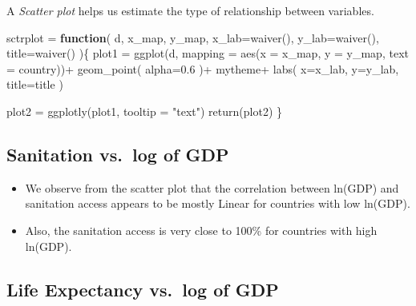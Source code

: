 \documentclass[
]{article}
\newenvironment{Shaded}{}{}
\newcommand{\AttributeTok}[1]{\textcolor[rgb]{0.84,0.60,0.13}{#1}}
\newcommand{\ControlFlowTok}[1]{\textcolor[rgb]{0.80,0.14,0.11}{\textbf{#1}}}
\newcommand{\FloatTok}[1]{\textcolor[rgb]{0.96,0.45,0.00}{#1}}
\newcommand{\FunctionTok}[1]{\textcolor[rgb]{0.41,0.62,0.42}{#1}}
\newcommand{\NormalTok}[1]{\textcolor[rgb]{0.24,0.22,0.21}{#1}}
\newcommand{\OtherTok}[1]{\textcolor[rgb]{0.41,0.62,0.42}{#1}}
\newcommand{\SpecialCharTok}[1]{\textcolor[rgb]{0.69,0.38,0.53}{#1}}
\newcommand{\StringTok}[1]{\textcolor[rgb]{0.60,0.59,0.10}{#1}}
\providecommand{\tightlist}{%
  \setlength{\itemsep}{0pt}\setlength{\parskip}{0pt}}\usepackage{longtable,booktabs,array}
\begin{document}
A \emph{Scatter plot} helps us estimate the type of relationship between
variables.

\begin{Shaded}
\begin{Highlighting}[]
\NormalTok{sctrplot }\OtherTok{=} \ControlFlowTok{function}\NormalTok{(}
\NormalTok{    d, x\_map, y\_map,}
    \AttributeTok{x\_lab=}\FunctionTok{waiver}\NormalTok{(), }\AttributeTok{y\_lab=}\FunctionTok{waiver}\NormalTok{(),}
    \AttributeTok{title=}\FunctionTok{waiver}\NormalTok{()}
\NormalTok{)\{}
\NormalTok{  plot1 }\OtherTok{=} \FunctionTok{ggplot}\NormalTok{(d, }\AttributeTok{mapping =} \FunctionTok{aes}\NormalTok{(}\AttributeTok{x =}\NormalTok{ x\_map, }\AttributeTok{y =}\NormalTok{ y\_map, }\AttributeTok{text =}\NormalTok{ country))}\SpecialCharTok{+}
    \FunctionTok{geom\_point}\NormalTok{(}
      \AttributeTok{alpha=}\FloatTok{0.6}
\NormalTok{    )}\SpecialCharTok{+}
\NormalTok{    mytheme}\SpecialCharTok{+}
    \FunctionTok{labs}\NormalTok{(}
      \AttributeTok{x=}\NormalTok{x\_lab,}
      \AttributeTok{y=}\NormalTok{y\_lab,}
      \AttributeTok{title=}\NormalTok{title}
\NormalTok{    )}
  
\NormalTok{  plot2 }\OtherTok{=} \FunctionTok{ggplotly}\NormalTok{(plot1,}
                   \AttributeTok{tooltip =} \StringTok{"text"}\NormalTok{)}
  \FunctionTok{return}\NormalTok{(plot2)}
\NormalTok{\}}
\end{Highlighting}
\end{Shaded}

\hypertarget{sanitation-vs.-log-of-gdp}{%
\subsection{Sanitation vs.~log of GDP}\label{sanitation-vs.-log-of-gdp}}

\begin{itemize}
\tightlist
\item
  We observe from the scatter plot that the correlation between ln(GDP)
  and sanitation access appears to be mostly Linear for countries with
  low ln(GDP).
\item
  Also, the sanitation access is very close to 100\% for countries with
  high ln(GDP).
\end{itemize}

\hypertarget{life-expectancy-vs.-log-of-gdp}{%
\subsection{Life Expectancy vs.~log of
GDP}\label{life-expectancy-vs.-log-of-gdp}}
\end{document}
